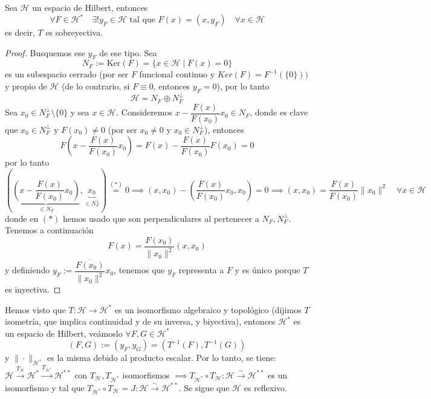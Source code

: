 \begin{teo}
    Sea $\mathcal{H}$ un espacio de Hilbert, entonces 
    \begin{equation*}
        \forall F \in \mathcal{H}^* \quad \exists! y_F \in \mathcal{H} \text{ tal que } F(x) = (x, y_F) \quad \forall x \in \mathcal{H}
    \end{equation*}
    es decir, $T$ es sobreyectiva.

\begin{proof}
    Busquemos ese $y_F$ de ese tipo. Sea 
    $$N_F := \text{Ker}(F) = \{x \in \mathcal{H} \mid F(x) = 0\}$$ 
    es un subespacio cerrado (por ser $F$ funcional continuo y $Ker(F)=F^{-1}(\{0\}))$ y propio de $\mathcal{H}$ (de lo contrario, si $F \equiv 0$, entonces $y_F = 0$), por lo tanto
    $$\mathcal{H} = N_F \oplus N_F^\perp$$
    Sea $x_0 \in N_F^\perp \setminus \{0\}$ y sea $x \in \mathcal{H}$. Consideremos $x - \dfrac{F(x)}{F(x_0)}x_0 \in N_F$, donde es clave que $x_0 \in N_F^\perp$ y $F(x_0) \neq 0$ (por ser $x_0 \neq 0$ y $x_0 \in N_F^\perp$), entonces
    \[ F\left( x - \frac{F(x)}{F(x_0)}x_0 \right) = F(x) - \frac{F(x)}{F(x_0)} F(x_0) = 0 \]
    por lo tanto
    \begin{equation*}
        \left( \underbrace{\left( x - \frac{F(x)}{F(x_0)}x_0 \right)}_{\in N_F}, \underbrace{x_0}_{\in N_F^\perp} \right)\overset{(*)}{=} 0\implies (x, x_0) - \left( \frac{F(x)}{F(x_0)}x_0, x_0 \right) = 0 \implies(x, x_0) = \frac{F(x)}{F(x_0)} \|x_0\|^2 \quad \forall x \in \mathcal{H} 
    \end{equation*}
    donde en $(*)$ hemos usado que son perpendiculares al pertenecer a $N_F, N_F^\perp$. Tenemos a continuación
    \[ F(x) = \frac{F(x_0)}{\|x_0\|^2} (x, x_0) \]
    y definiendo $y_F := \dfrac{\overline{F(x_0)}}{\|x_0\|^2} x_0$, tenemos que $y_F$ representa a $F$ y es único porque $T$ es inyectiva.
\end{proof}
\end{teo}

\begin{observacion}
    Hemos visto que $T: \mathcal{H} \longrightarrow \mathcal{H}^*$ es un isomorfismo algebraico y topológico (dijimos $T$ isometría, que implica continuidad y de su inversa, y biyectiva), entonces $\mathcal{H}^*$ es un espacio de Hilbert, veámoslo $\forall F, G \in \mathcal{H}^*$
    \[ (F, G) := (y_F, y_G) = (T^{-1}(F), T^{-1}(G)) \]
    y $\|\cdot\|_{\mathcal{H}^*}$ es la misma debido al producto escalar.
    Por lo tanto, se tiene: $\mathcal{H} \xrightarrow{T_{\mathcal{H}}} \mathcal{H}^* \xrightarrow{T_{\mathcal{H}^*}} \mathcal{H}^{**}$ con $T_{\mathcal{H}}, T_{\mathcal{H}^*}$ isomorfismos $\implies T_{\mathcal{H}^*} \circ T_{\mathcal{H}} : \mathcal{H} \xrightarrow{\sim} \mathcal{H}^{**}$ es un isomorfismo y tal que $T_{\mathcal{H}^*} \circ T_{\mathcal{H}} = J : \mathcal{H} \xrightarrow{\sim} \mathcal{H}^{**}$. Se sigue que $\mathcal{H}$ es reflexivo.
\end{observacion}


